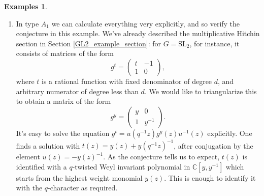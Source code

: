 \documentclass[11pt, oneside, reqno]{amsart}
\theoremstyle{definition} \newtheorem{definition}{Definition}[section]
\theoremstyle{definition} \newtheorem{remark}[definition]{Remark}
\theoremstyle{definition} \newtheorem{remarks}[definition]{Remarks}
\theoremstyle{definition} \newtheorem{question}[definition]{Question}
\theoremstyle{definition} \newtheorem*{note}{Note}
\theoremstyle{definition} \newtheorem{example}[definition]{Example}
\theoremstyle{definition} \newtheorem{examples}[definition]{Examples}
\newcommand{\SL}{\mathrm{SL}}
\begin{document}
\begin{examples}
\begin{enumerate}
 \item In type $A_1$ we can calculate everything very explicitly, and so verify the conjecture in this example.  We've already described the multiplicative Hitchin section in Section \ref{GL2_example_section}: for $G = \SL_2$, for instance, it consists of matrices of the form
\begin{equation*}
  g^{t} =
  \begin{pmatrix}
    t   & - 1 \\
    1 & 0
  \end{pmatrix},
\end{equation*}
where $t$ is a rational function with fixed denominator of degree $d$, and arbitrary numerator of degree less than $d$.  We would like to triangularize this to obtain a matrix of the form
\begin{equation*}
  g^{y} =
  \begin{pmatrix}
    y  & 0 \\
    1 & y^{-1} 
  \end{pmatrix}.
\end{equation*}
It's easy to solve the equation $g^t = u(q^{-1}z)g^y(z) u^{-1}(z)$ explicitly.  One finds a solution with $t(z) = y(z) + y(q^{-1}z)^{-1}$, after conjugation by the element $u(z) = - y(z)^{-1}$.  As the conjecture tells us to expect, $t(z)$ is identified with a $q$-twisted Weyl invariant polynomial in $\mathbb{C}[y, y^{-1}]$ which starts from the highest weight monomial $y(z)$.   This is enough to identify it with the $q$-character as required.


\end{enumerate}
\end{examples}
\end{document}
